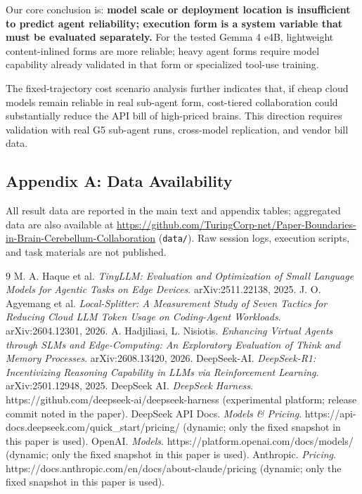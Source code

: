 \documentclass[
]{article}
\begin{document}
Our core conclusion is: \textbf{model scale or deployment location is insufficient to predict agent reliability; execution form is a system variable that must be evaluated separately.} For the tested Gemma 4 e4B, lightweight content-inlined forms are more reliable; heavy agent forms require model capability already validated in that form or specialized tool-use training.

The fixed-trajectory cost scenario analysis further indicates that, if cheap cloud models remain reliable in real sub-agent form, cost-tiered collaboration could substantially reduce the API bill of high-priced brains. This direction requires validation with real G5 sub-agent runs, cross-model replication, and vendor bill data.

\subsection*{Appendix A: Data Availability}
All result data are reported in the main text and appendix tables; aggregated data are also available at \url{https://github.com/TuringCorp-net/Paper-Boundaries-in-Brain-Cerebellum-Collaboration} (\texttt{data/}). Raw session logs, execution scripts, and task materials are not published.

\begin{thebibliography}{9}
 M. A. Haque et al. \emph{TinyLLM: Evaluation and Optimization of Small Language Models for Agentic Tasks on Edge Devices}. arXiv:2511.22138, 2025.
 J. O. Agyemang et al. \emph{Local-Splitter: A Measurement Study of Seven Tactics for Reducing Cloud LLM Token Usage on Coding-Agent Workloads}. arXiv:2604.12301, 2026.
 A. Hadjiliasi, L. Nisiotis. \emph{Enhancing Virtual Agents through SLMs and Edge-Computing: An Exploratory Evaluation of Think and Memory Processes}. arXiv:2608.13420, 2026.
 DeepSeek-AI. \emph{DeepSeek-R1: Incentivizing Reasoning Capability in LLMs via Reinforcement Learning}. arXiv:2501.12948, 2025.
 DeepSeek AI. \emph{DeepSeek Harness}. https://github.com/deepseek-ai/deepseek-harness (experimental platform; release commit noted in the paper).
 DeepSeek API Docs. \emph{Models \& Pricing}. https://api-docs.deepseek.com/quick\_start/pricing/ (dynamic; only the fixed snapshot in this paper is used).
 OpenAI. \emph{Models}. https://platform.openai.com/docs/models/ (dynamic; only the fixed snapshot in this paper is used).
 Anthropic. \emph{Pricing}. https://docs.anthropic.com/en/docs/about-claude/pricing (dynamic; only the fixed snapshot in this paper is used).
\end{thebibliography}
\end{document}
